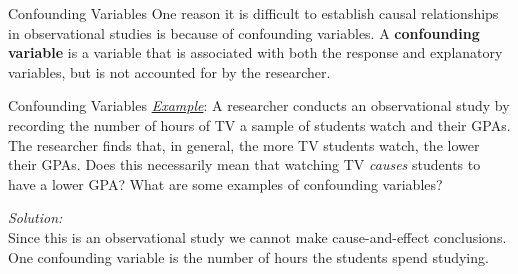 \documentclass[10pt]{beamer}
\begin{document}
\begin{frame}{Confounding Variables}
One reason it is difficult to establish causal relationships in observational studies is because of confounding variables. A \textbf{confounding variable} is a variable that is associated with both the response and explanatory variables, but is not accounted for by the researcher.
\end{frame}

\begin{frame}{Confounding Variables}
\vspace{-1.75cm}
\emph{\underline{Example}}:  A researcher conducts an observational study by recording the number of hours of TV a sample of students watch and their GPAs.  The researcher finds that, in general, the more TV students watch, the lower their GPAs.  Does this necessarily mean that watching TV \emph{causes} students to have a lower GPA?  What are some examples of confounding variables?\\
\vspace{10pt}

{\color{blue} \emph{Solution:}\\
Since this is an observational study we cannot make cause-and-effect conclusions.  One confounding variable is the number of hours the students spend studying.}
\end{frame}
\end{document}
